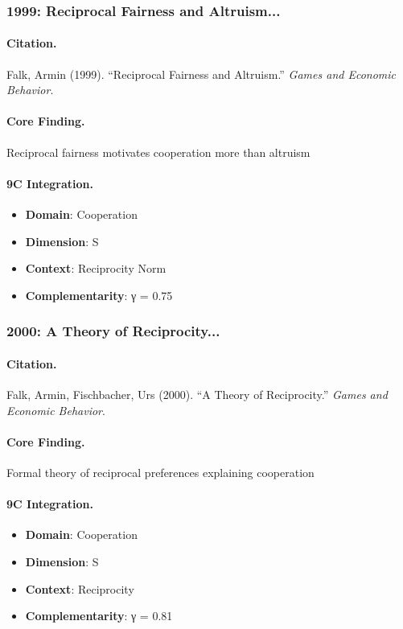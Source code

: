 \subsubsection{1999: Reciprocal Fairness and Altruism...}

\paragraph{Citation.}
Falk, Armin (1999). ``Reciprocal Fairness and Altruism.''
\textit{Games and Economic Behavior}.

\paragraph{Core Finding.}
Reciprocal fairness motivates cooperation more than altruism

\paragraph{9C Integration.}
\begin{itemize}[nosep]
  \item \textbf{Domain}: Cooperation
  \item \textbf{Dimension}: S
  \item \textbf{Context}: Reciprocity Norm
  \item \textbf{Complementarity}: γ = 0.75
\end{itemize}


\subsubsection{2000: A Theory of Reciprocity...}

\paragraph{Citation.}
Falk, Armin, Fischbacher, Urs (2000). ``A Theory of Reciprocity.''
\textit{Games and Economic Behavior}.

\paragraph{Core Finding.}
Formal theory of reciprocal preferences explaining cooperation

\paragraph{9C Integration.}
\begin{itemize}[nosep]
  \item \textbf{Domain}: Cooperation
  \item \textbf{Dimension}: S
  \item \textbf{Context}: Reciprocity
  \item \textbf{Complementarity}: γ = 0.81
\end{itemize}


